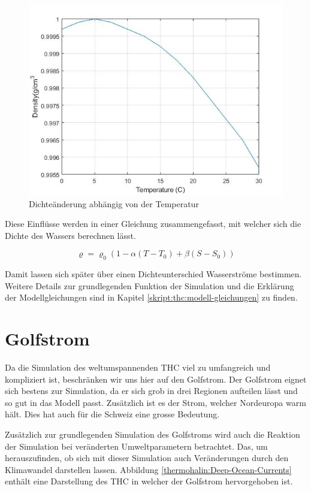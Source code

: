 \begin{figure}
	\centering
	\includegraphics[width=12cm]{thermohalin/Code/graphs/graph_temp.jpg}
	\caption{Dichteänderung abhängig von der Temperatur\label{thermohalin:graph-temp}}
\end{figure}

 Diese Einflüsse werden in einer Gleichung zusammengefasst, mit welcher sich die Dichte des Wassers berechnen lässt.
 

\begin{equation}
\varrho
=
\varrho_0(1-\alpha(T-T_0)+\beta(S-S_0))
\label{thermohalin:Dichte}
\end{equation} 

Damit lassen sich später über einen Dichteunterschied Wasserströme bestimmen.
Weitere Details zur grundlegenden Funktion der Simulation und die Erklärung der Modellgleichungen sind in Kapitel \ref{skript:thc:modell-gleichungen} zu finden.


\section{Golfstrom}

Da die Simulation des weltumspannenden THC viel zu umfangreich und kompliziert ist, beschränken wir uns hier auf den Golfstrom.
Der Golfstrom eignet sich bestens zur Simulation, da er sich grob in drei Regionen aufteilen lässt und so gut in das Modell passt. Zusätzlich ist es der Strom, welcher Nordeuropa warm hält. Dies hat auch für die Schweiz eine grosse Bedeutung.

Zusätzlich zur grundlegenden Simulation des Golfstroms wird auch die Reaktion der Simulation bei veränderten Umweltparametern betrachtet. Das, um herauszufinden, ob sich mit dieser Simulation auch Veränderungen durch den Klimawandel darstellen lassen. Abbildung \ref{thermohalin:Deep-Ocean-Currents} enthält eine Darstellung des THC in welcher der Golfstrom hervorgehoben ist. 

